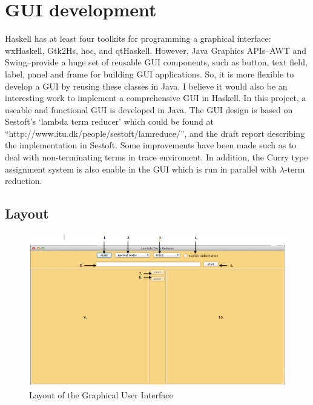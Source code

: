 \chapter{GUI development}

Haskell has at least four toolkits for programming a graphical interface: wxHaskell, Gtk2Hs, hoc, and qtHaskell. However, Java Graphics APIs--AWT and Swing--provide a huge set of reusable GUI components, such as button, text field, label, panel and frame for building GUI applications. So, it is more flexible to develop a GUI by reusing these classes in Java. I believe it would also be an interesting work to implement a comprehensive GUI in Haskell. In this project, a useable and functional GUI is developed in Java. The GUI design is based on Sestoft's `lambda term reducer' which could be found at ``http://www.itu.dk/people/sestoft/lamreduce/'', and the draft report describing the implementation in Sestoft\cite{sestoft1996}. Some improvements have been made such as to deal with non-terminating terms in trace enviroment. In addition, the Curry type assignment system is also enable in the GUI which is run in parallel with $\lambda$-term reduction.    

\section{Layout}

\begin{figure}[ht]
\centering
\includegraphics[width=\textwidth]{pics/GUILax}
\caption{Layout of the Graphical User Interface}
\label{fig:gui}
\end{figure}

